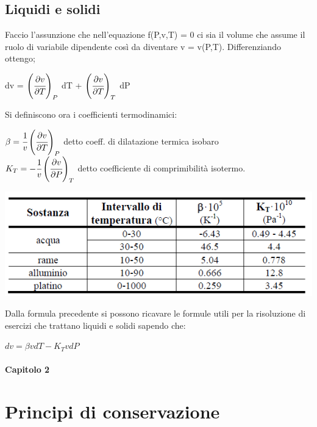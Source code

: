 \documentclass[a4paper,12pt,titlepage]{article}
\begin{document}
\subsection{Liquidi e solidi}

Faccio l'assunzione che nell'equazione f(P,v,T) = 0 ci sia il volume che assume il ruolo di variabile dipendente così da diventare v = v(P,T). Differenziando ottengo; \begin{center}
dv = $\left(\cfrac{\partial v}{\partial T}\right)_{P}$ dT +  $\left(\cfrac{\partial v}{\partial T}\right)_{T}$ dP
\end{center} 
Si definiscono ora i coefficienti termodinamici:
\begin{center}
$\beta = \cfrac{1}{v}\left( \cfrac{\partial v}{\partial T} \right) _{P}$ detto coeff. di dilatazione termica isobaro \\
$K_{T} = -\cfrac{1}{v}\left( \cfrac{\partial v}{\partial P} \right)_{T} $
detto coefficiente di comprimibilità isotermo.
\end{center}
\includegraphics[scale=0.8]{Coefficienti}

Dalla formula precedente si possono ricavare le formule utili per la risoluzione di esercizi che trattano liquidi e solidi sapendo che:
\begin{center}
$ dv = \beta vdT - K_{T}vdP $
\end{center}

\paragraph{Capitolo 2}
\section{Principi di conservazione}
\end{document}
